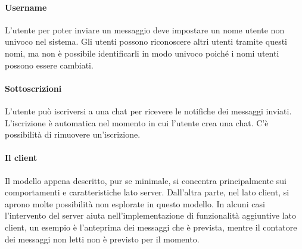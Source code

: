 \paragraph{Username} L'utente per poter inviare un messaggio deve impostare un nome utente non univoco nel sistema. Gli utenti possono riconoscere altri utenti tramite questi nomi, ma non è possibile identificarli in modo univoco poiché i nomi utenti possono essere cambiati.

\paragraph{Sottoscrizioni} L'utente può iscriversi a una chat per ricevere le notifiche dei messaggi inviati. L'iscrizione è automatica nel momento in cui l'utente crea una chat. C'è possibilità di rimuovere un'iscrizione.

\paragraph{Il client} Il modello appena descritto, pur se minimale, si concentra principalmente sui comportamenti e caratteristiche lato server. Dall'altra parte, nel lato client, si aprono molte possibilità non esplorate in questo modello. In alcuni casi l'intervento del server aiuta nell'implementazione di funzionalità aggiuntive lato client, un esempio è l'anteprima dei messaggi che è prevista, mentre il contatore dei messaggi non letti non è previsto per il momento.
